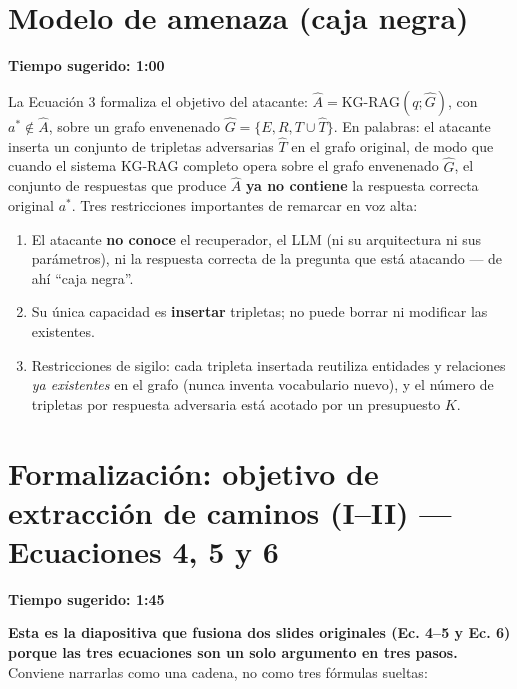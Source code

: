 \documentclass[11pt]{article}
\newcommand{\tiempo}[1]{{\small\color{timecolor}\textbf{Tiempo sugerido: #1}}\par\vspace{0.3em}}
\begin{document}
\section{Modelo de amenaza (caja negra)}
\tiempo{1:00}
La Ecuación 3 formaliza el objetivo del atacante:
$\hat{A} = \text{KG-RAG}(q; \hat{G})$, con $a^{*} \notin \hat{A}$, sobre un grafo envenenado
$\hat{G} = \{E, R, T \cup \hat{T}\}$. En palabras: el atacante inserta un conjunto de
tripletas adversarias $\hat{T}$ en el grafo original, de modo que cuando el sistema
KG-RAG completo opera sobre el grafo envenenado $\hat{G}$, el conjunto de respuestas que
produce $\hat{A}$ \textbf{ya no contiene} la respuesta correcta original $a^{*}$. Tres
restricciones importantes de remarcar en voz alta:
\begin{enumerate}
  \item El atacante \textbf{no conoce} el recuperador, el LLM (ni su arquitectura ni sus
    parámetros), ni la respuesta correcta de la pregunta que está atacando --- de ahí
    ``caja negra''.
  \item Su única capacidad es \textbf{insertar} tripletas; no puede borrar ni modificar las
    existentes.
  \item Restricciones de sigilo: cada tripleta insertada reutiliza entidades y relaciones
    \emph{ya existentes} en el grafo (nunca inventa vocabulario nuevo), y el número de
    tripletas por respuesta adversaria está acotado por un presupuesto $K$.
\end{enumerate}

\section{Formalización: objetivo de extracción de caminos (I--II) --- Ecuaciones 4, 5 y 6}
\tiempo{1:45}
\textbf{Esta es la diapositiva que fusiona dos slides originales (Ec. 4--5 y Ec. 6) porque
las tres ecuaciones son un solo argumento en tres pasos.} Conviene narrarlas como una
cadena, no como tres fórmulas sueltas:
\end{document}
